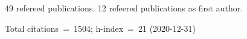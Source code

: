 49 refereed publications. 12 refeered publications as first author.

Total citations~=~1504; h-index~=~21 (2020-12-31)